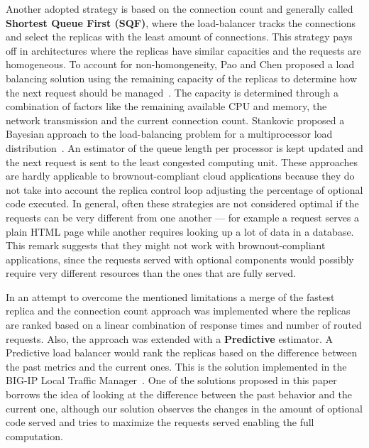 Another adopted strategy is based on the connection count and
generally called \textbf{Shortest Queue First (SQF)}, where the
load-balancer tracks the connections and select the replicas with the
least amount of connections. This strategy pays off in architectures
where the replicas have similar capacities and the requests are
homogeneous. To account for non-homongeneity, Pao and Chen proposed a
load balancing solution using the remaining capacity of the replicas
to determine how the next request should be
managed~\cite{feedbackintensive}. The capacity is determined through a
combination of factors like the remaining available CPU and memory,
the network transmission and the current connection count. Stankovic
proposed a Bayesian approach to the load-balancing problem for a
multiprocessor load distribution~\cite{Stankovic:TC}. An estimator of
the queue length per processor is kept updated and the next request is
sent to the least congested computing unit.
These approaches are
hardly applicable to brownout-compliant cloud applications because
they do not take into account the replica control loop adjusting the
percentage of optional code executed. In general, often these
strategies are not considered optimal if the requests can be very
different from one another --- for example a request serves a plain
HTML page while another requires looking up a lot of data in a
database. This remark suggests that they might not work with
brownout-compliant applications, since the requests served with
optional components would possibly require very different resources
than the ones that are fully served.

In an attempt to overcome the mentioned limitations a merge of the
fastest replica and the connection count approach was implemented
where the replicas are ranked based on a linear combination of
response times and number of routed requests. Also, the approach was
extended with a \textbf{Predictive} estimator. A Predictive load
balancer would rank the replicas based on the difference between the
past metrics and the current ones. This is the solution implemented in
the BIG-IP Local Traffic Manager~\cite{BIGIP}. One of the solutions
proposed in this paper borrows the idea of looking at the difference
between the past behavior and the current one, although our solution
observes the changes in the amount of optional code served and tries
to maximize the requests served enabling the full computation.

